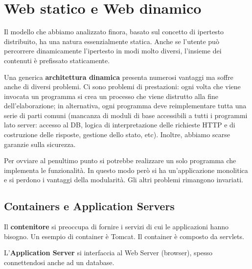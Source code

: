 \section{Web statico e Web dinamico}

    Il modello che abbiamo analizzato finora, basato sul concetto di ipertesto distribuito, ha una natura essenzialmente statica. Anche se l’utente può percorrere dinamicamente l’ipertesto in modi molto diversi, l’insieme dei contenuti è prefissato staticamente.
    
    \vspace{3mm}
    
    Una generica \textbf{architettura dinamica} presenta numerosi vantaggi ma soffre anche di diversi problemi. Ci sono problemi di prestazioni: ogni volta che viene invocata un programma si crea un processo che viene distrutto alla fine dell’elaborazione; in alternativa, ogni programma deve reimplementare tutta una serie di parti comuni (mancanza di moduli di base accessibili a tutti i programmi lato server: accesso al DB, logica di interpretazione delle richieste HTTP e di costruzione delle risposte, gestione dello stato, etc). Inoltre, abbiamo scarse garanzie sulla sicurezza.
    
    \vspace{3mm}
    
    Per ovviare al penultimo punto si potrebbe realizzare un solo programma che implementa le funzionalità. In questo modo però si ha un’applicazione monolitica e si perdono i vantaggi della modularità. Gli altri problemi rimangono invariati.
        
    \subsection{Containers e Application Servers}
        
    Il \textbf{contenitore} si preoccupa di fornire i servizi di cui le applicazioni hanno bisogno. Un esempio di container è Tomcat. Il container è composto da servlets.
    
    L'\textbf{Application Server} si interfaccia al Web Server (browser), spesso connettendosi anche ad un database.
    

